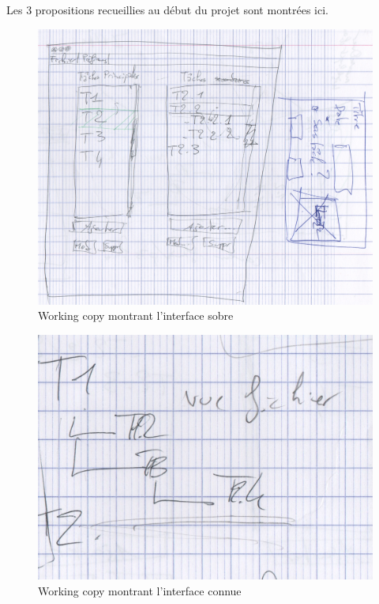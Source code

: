 \documentclass[11pt]{article}
\begin{document}
Les 3 propositions recueillies au début du projet sont montrées ici.

\begin{figure}[H]
  \centering
  \includegraphics[width=12cm]{img/sobre.jpg}
  \caption{Working copy montrant l'interface sobre}
  \label{fig:sobre}
\end{figure}

\begin{figure}[H]
  \centering
  \includegraphics[width=12cm]{img/connue.jpg}
  \caption{Working copy montrant l'interface connue}
  \label{fig:connue}
\end{figure}
\end{document}
